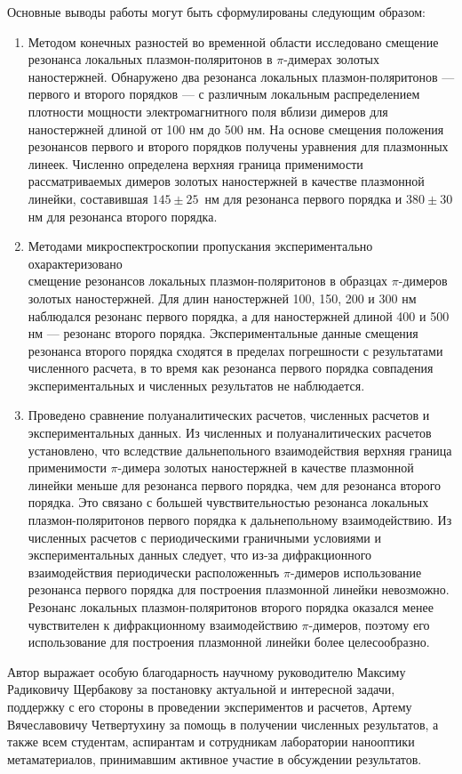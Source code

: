 
Основные выводы работы могут быть сформулированы следующим образом:
\begin{enumerate}
\item Методом конечных разностей во временной области исследовано смещение резонанса локальных плазмон-поляритонов в $ \pi $-димерах золотых наностержней. Обнаружено два резонанса локальных плазмон-поляритонов --- первого и второго порядков --- с различным локальным распределением плотности мощности электромагнитного поля вблизи димеров для наностержней длиной от 100 нм до 500 нм. На основе смещения положения резонансов первого и второго порядков получены уравнения для плазмонных линеек. Численно определена верхняя граница применимости рассматриваемых димеров золотых наностержней в качестве плазмонной линейки, составившая $ 145 \pm 25 $~нм для резонанса первого порядка и $ 380 \pm 30 $ нм для резонанса второго порядка.
\item Методами микроспектроскопии пропускания экспериментально охарактеризовано\\ смещение резонансов локальных плазмон-поляритонов в образцах $ \pi $-димеров золотых наностержней.  Для длин наностержней 100, 150, 200 и 300 нм наблюдался резонанс первого порядка, а для наностержней длиной 400 и 500 нм --- резонанс второго порядка. Экспериментальные данные смещения резонанса второго порядка сходятся в пределах погрешности с результатами численного расчета, в то время как резонанса первого порядка совпадения экспериментальных и численных результатов не наблюдается.
\item Проведено сравнение полуаналитических расчетов, численных расчетов и экспериментальных данных. Из численных и полуаналитических расчетов установлено, что вследствие дальнепольного взаимодействия верхняя граница применимости $ \pi $-димера золотых наностержней в качестве плазмонной линейки меньше для резонанса первого порядка, чем для резонанса второго порядка. Это связано с большей чувствительностью резонанса локальных плазмон-поляритонов первого порядка к дальнепольному взаимодействию. Из численных расчетов с периодическими граничными условиями и экспериментальных данных следует, что из-за дифракционного взаимодействия периодически расположенныъ $ \pi $-димеров использование резонанса первого порядка для построения плазмонной линейки невозможно. Резонанс локальных плазмон-поляритонов второго порядка оказался менее чувствителен к дифракционному взаимодействию $ \pi $-димеров, поэтому его использование для построения плазмонной линейки более целесообразно.

\end{enumerate}

Автор выражает особую благодарность научному руководителю Максиму Радиковичу Щербакову за постановку актуальной и интересной задачи, поддержку с его стороны в проведении экспериментов и расчетов, Артему Вячеславовичу Четвертухину за помощь в получении численных результатов, а также всем студентам, аспирантам и сотрудникам лаборатории нанооптики метаматериалов, принимавшим активное участие в обсуждении результатов.